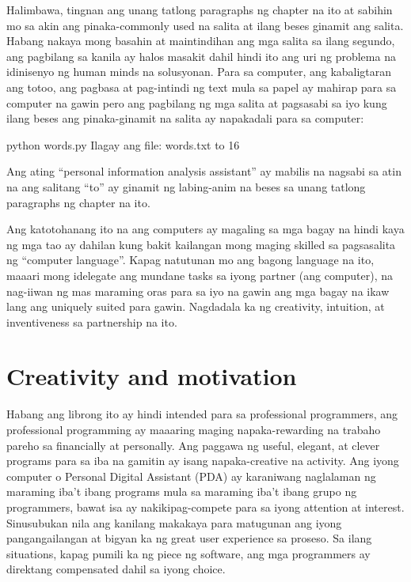 \documentclass[10pt,]{book}
\newenvironment{Shaded}{}{}
\newcommand{\BuiltInTok}[1]{\textcolor[rgb]{0.00,0.50,0.00}{#1}}
\newcommand{\DecValTok}[1]{\textcolor[rgb]{0.25,0.63,0.44}{#1}}
\newcommand{\NormalTok}[1]{#1}
\begin{document}
Halimbawa, tingnan ang unang tatlong paragraphs ng chapter na ito at
sabihin mo sa akin ang pinaka-commonly used na salita at ilang beses
ginamit ang salita. Habang nakaya mong basahin at maintindihan ang mga
salita sa ilang segundo, ang pagbilang sa kanila ay halos masakit dahil
hindi ito ang uri ng problema na idinisenyo ng human minds na
solusyonan. Para sa computer, ang kabaligtaran ang totoo, ang pagbasa at
pag-intindi ng text mula sa papel ay mahirap para sa computer na gawin
pero ang pagbilang ng mga salita at pagsasabi sa iyo kung ilang beses
ang pinaka-ginamit na salita ay napakadali para sa computer:

\begin{Shaded}
\begin{Highlighting}[]
\NormalTok{python words.py}
\NormalTok{Ilagay ang }\BuiltInTok{file}\NormalTok{: words.txt}
\NormalTok{to }\DecValTok{16}
\end{Highlighting}
\end{Shaded}

Ang ating ``personal information analysis assistant'' ay mabilis na
nagsabi sa atin na ang salitang ``to'' ay ginamit ng labing-anim na
beses sa unang tatlong paragraphs ng chapter na ito.

Ang katotohanang ito na ang computers ay magaling sa mga bagay na hindi
kaya ng mga tao ay dahilan kung bakit kailangan mong maging skilled sa
pagsasalita ng ``computer language''. Kapag natutunan mo ang bagong
language na ito, maaari mong idelegate ang mundane tasks sa iyong
partner (ang computer), na nag-iiwan ng mas maraming oras para sa iyo na
gawin ang mga bagay na ikaw lang ang uniquely suited para gawin.
Nagdadala ka ng creativity, intuition, at inventiveness sa partnership
na ito.

\section{Creativity and motivation}\label{creativity-and-motivation}

Habang ang librong ito ay hindi intended para sa professional
programmers, ang professional programming ay maaaring maging
napaka-rewarding na trabaho pareho sa financially at personally. Ang
paggawa ng useful, elegant, at clever programs para sa iba na gamitin ay
isang napaka-creative na activity. Ang iyong computer o Personal Digital
Assistant (PDA) ay karaniwang naglalaman ng maraming iba't ibang
programs mula sa maraming iba't ibang grupo ng programmers, bawat isa ay
nakikipag-compete para sa iyong attention at interest. Sinusubukan nila
ang kanilang makakaya para matugunan ang iyong pangangailangan at bigyan
ka ng great user experience sa proseso. Sa ilang situations, kapag
pumili ka ng piece ng software, ang mga programmers ay direktang
compensated dahil sa iyong choice.
\end{document}
